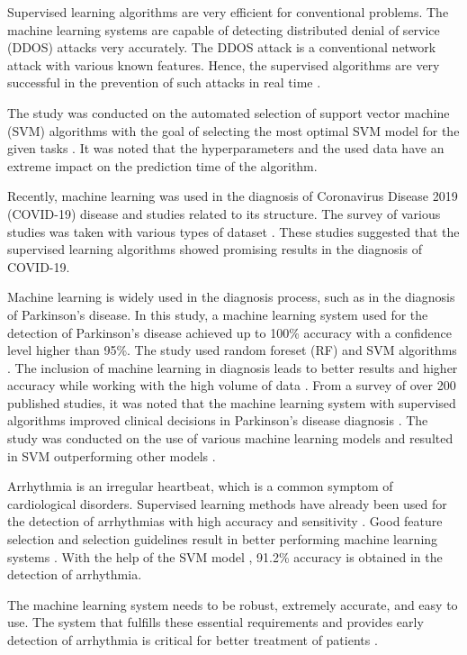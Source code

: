 \documentclass[a4paper,fleqn]{cas-dc}
\begin{document}
Supervised learning algorithms are very efficient for conventional problems. The machine learning systems are capable of detecting distributed denial of service (DDOS) attacks very accurately. The DDOS attack is a conventional network attack with various known features. Hence, the supervised algorithms are very successful in the prevention of such attacks in real time \cite{ref_paper_9}.

The study was conducted on the automated selection of support vector machine (SVM) algorithms with the goal of selecting the most optimal SVM model for the given tasks \cite{ref_paper_2}. It was noted that the hyperparameters and the used data have an extreme impact on the prediction time of the algorithm.

Recently, machine learning was used in the diagnosis of Coronavirus Disease 2019 (COVID-19) disease and studies related to its structure. The survey of various studies was taken with various types of dataset \cite{ref_paper_20}. These studies suggested that the supervised learning algorithms showed promising results in the diagnosis of COVID-19.

Machine learning is widely used in the diagnosis process, such as in the diagnosis of Parkinson's disease. In this study, a machine learning system used for the detection of Parkinson's disease achieved up to 100\% accuracy with a confidence level higher than 95\%. The study used random foreset (RF) and SVM algorithms \cite{ref_paper_34}. The inclusion of machine learning in diagnosis leads to better results and higher accuracy while working with the high volume of data \cite{ref_paper_15}. From a survey of over 200 published studies, it was noted that the machine learning system with supervised algorithms improved clinical decisions in Parkinson's disease diagnosis \cite{ref_paper_27}. The study was conducted on the use of various machine learning models and resulted in SVM outperforming other models \cite{ref_paper_30}.

Arrhythmia is an irregular heartbeat, which is a common symptom of cardiological disorders. Supervised learning methods have already been used for the detection of arrhythmias with high accuracy and sensitivity \cite{ref_paper_16}. Good feature selection and selection guidelines result in better performing machine learning systems \cite{ref_paper_28}. With the help of the SVM model \cite{ref_paper_38}, 91.2\% accuracy is obtained in the detection of arrhythmia.

The machine learning system needs to be robust, extremely accurate, and easy to use. The system that fulfills these essential requirements and provides early detection of arrhythmia is critical for better treatment of patients \cite{ref_paper_4}.
\end{document}
